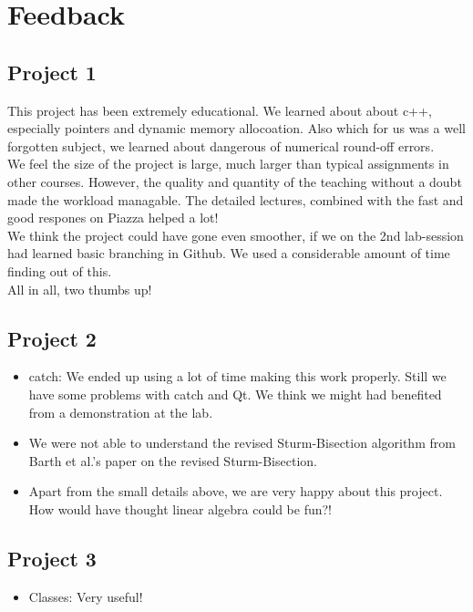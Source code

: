 \documentclass{article}
\begin{document}
\section{Feedback}
\subsection{Project 1}
This project has been extremely educational. We learned about about c++, especially pointers and dynamic memory allocoation. Also which for us was a well forgotten subject, we learned about dangerous of numerical round-off errors. \\

We feel the size of the project is large, much larger than typical assignments in other courses. However, the quality and quantity of the teaching without a doubt made the workload managable. The detailed lectures, combined with the fast and good respones on Piazza helped a lot!\\

We think the project could have gone even smoother, if we on the 2nd lab-session had learned basic branching in Github. We used a considerable amount of time finding out of this.\\

All in all, two thumbs up!

\subsection{Project 2}
\begin{itemize}
	\item  catch: We ended up using a lot of time making this work properly. Still we have some problems with catch and Qt. We think we might had benefited from a demonstration at the lab.
	
	\item We were not able to understand the revised Sturm-Bisection algorithm from Barth et al.'s \cite{barth} paper on the revised Sturm-Bisection. 
	
	\item Apart from the small details above, we are very happy about this project. How would have thought linear algebra could be fun?!
\end{itemize}

\subsection{Project 3}
\begin{itemize}
	\item  Classes: Very useful!
\end{itemize}
\end{document}
